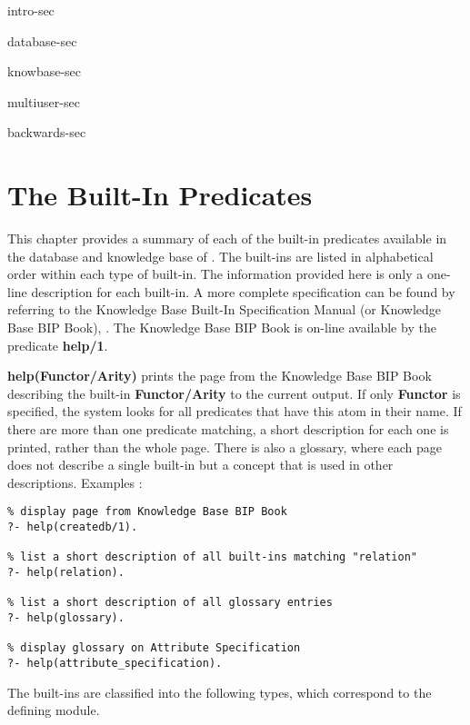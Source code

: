  {intro-sec}

 {database-sec}

 {knowbase-sec}

 {multiuser-sec}

 {backwards-sec}


\chapter{The Built-In Predicates}
\label{bip-summary}

This chapter provides a summary of each of the built-in 
predicates available in the database and knowledge base of \eclipse. The
built-ins are listed 
in alphabetical order within each type of built-in. The information
provided here is only a one-line description for each built-in.
A more complete specification can be found by
referring to the Knowledge Base Built-In Specification Manual (or Knowledge
Base BIP Book), 
\cite{BIP92}. The Knowledge Base BIP Book is on-line available by the
predicate {\bf help/1}.

{\bf help(Functor/Arity)} prints the page from the Knowledge Base BIP Book
describing the  
built-in {\bf Functor/Arity} to the current output. If only {\bf Functor}
is specified, the system looks for all predicates that have this atom in 
their name. If there are more than one predicate
matching, a short description for each one is printed, rather than the
whole page. There is also a glossary, where each page does not describe
a single built-in but a concept that is used in other descriptions.
Examples :

\begin{verbatim}
% display page from Knowledge Base BIP Book
?- help(createdb/1).

% list a short description of all built-ins matching "relation"
?- help(relation).    

% list a short description of all glossary entries
?- help(glossary).

% display glossary on Attribute Specification
?- help(attribute_specification).
\end{verbatim}

The built-ins are classified into the following types,
which correspond to the defining module.

